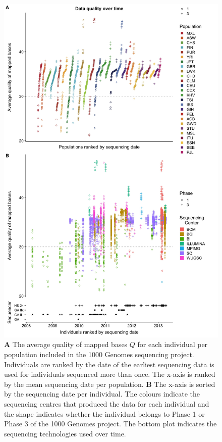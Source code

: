 \documentclass[custompaper]{MBE}%
\begin{document}
\begin{figure}
\includegraphics[width=0.95\hsize,keepaspectratio]{./Figures/MapQualOverTime.jpg}

\caption{\textbf{A} The average quality of mapped bases $Q$ for each individual per population included in the 1000 Genomes sequencing project. Individuals are ranked by the date of the earliest sequencing data is used for individuals sequenced more than once. The x-axis is ranked by the mean sequencing date per population. \textbf{B} The x-axis is sorted by the sequencing date per individual. The colours indicate the sequencing centres that produced the data for each individual and the shape indicates whether the individual belongs to Phase 1 or Phase 3 of the 1000 Genomes project. The bottom plot indicates the sequencing technologies used over time.}
\label{MapQual}
\end{figure}
\end{document}
